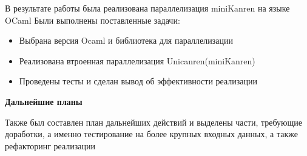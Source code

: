 

В результате работы была реализована параллелизация miniKanren на языке OCaml
Были выполнены поставленные задачи:


\begin{itemize}
\item Выбрана версия Ocaml и библиотека для параллелизации
\item Реализована втроенная параллелизация Unicanren(miniKanren)
\item Проведены тесты и сделан вывод об эффективности реализации
\end{itemize}


\textbf{Дальнейшие планы}

Также был составлен план дальнейших действий и выделены части,
требующие доработки, а именно тестирование на более крупных входных данных, а также рефакторинг реализации



